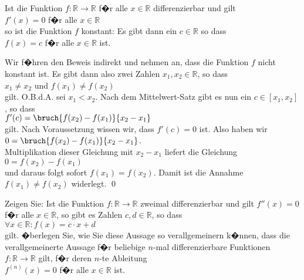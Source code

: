 \begin{Lemma} \label{lemma:0_ableitung}
Ist die Funktion $f:\mathbb{R} \rightarrow \mathbb{R}$ f�r alle $x \in \mathbb{R}$
differenzierbar und gilt
\\[0.2cm]
\hspace*{1.3cm}
$f'(x) = 0$ \quad f�r alle $x \in \mathbb{R}$
\\[0.2cm]
so ist die Funktion $f$ konstant:  Es gibt dann ein $c \in \mathbb{R}$ so dass
\\[0.2cm]
\hspace*{1.3cm}
$f(x) = c$ \quad f�r alle $x \in \mathbb{R}$ ist.
\end{Lemma}

\proof
Wir f�hren den Beweis indirekt und nehmen an, dass die Funktion $f$ nicht konstant ist.
Es gibt dann also zwei Zahlen $x_1, x_2\in \mathbb{R}$, so dass 
\\[0.2cm]
\hspace*{1.3cm}
$x_1 \not= x_2$ \quad und \quad $f(x_1) \not= f(x_2)$
\\[0.2cm]
gilt.  O.B.d.A. sei $x_1 < x_2$.  Nach dem Mittelwert-Satz gibt es nun ein $c \in [x_1,x_2]$, so dass
\\[0.2cm]
\hspace*{1.3cm}
$f'(c) = \bruch{f(x_2) - f(x_1)}{x_2 - x_1}$ 
\\[0.2cm]
gilt.  Nach Voraussetzung wissen wir, dass $f'(c) = 0$ ist.  Also haben wir
\\[0.2cm]
\hspace*{1.3cm}
$0 = \bruch{f(x_2) - f(x_1)}{x_2 - x_1}$.
\\[0.2cm]
Multiplikation dieser Gleichung mit $x_2 - x_1$ liefert die Gleichung
\\[0.2cm]
\hspace*{1.3cm}
$0 = f(x_2) - f(x_1)$
\\[0.2cm]
und daraus folgt sofort $f(x_1) = f(x_2)$.  Damit ist die Annahme $f(x_1) \not= f(x_2)$ widerlegt. \qed

\exercise
Zeigen Sie: Ist die Funktion $f:\mathbb{R} \rightarrow \mathbb{R}$ zweimal differenzierbar und gilt
$f''(x) = 0$ f�r alle $x \in \mathbb{R}$, so gibt es Zahlen $c,d \in \mathbb{R}$, so dass 
\\[0.2cm]
\hspace*{1.3cm}
$\forall x \in \mathbb{R}: f(x) = c \cdot x + d$
\\[0.2cm]
gilt.  �berlegen  Sie, wie Sie diese Aussage so verallgemeinern k�nnen, dass die verallgemeinerte Aussage
f�r beliebige $n$-mal differenzierbare 
Funktionen $f:\mathbb{R} \rightarrow \mathbb{R}$ gilt, f�r deren $n$-te Ableitung 
\\[0.2cm]
\hspace*{1.3cm}
$f^{(n)}(x) = 0$ \quad f�r alle $x \in \mathbb{R}$ ist.  \eox


